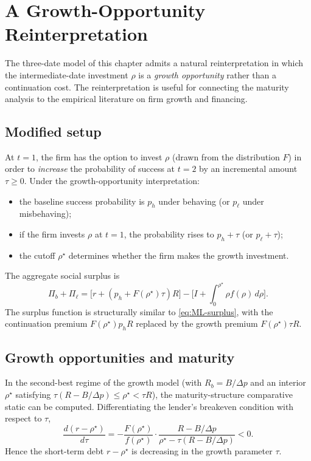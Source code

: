 \documentclass[11pt,a4paper,oneside]{book}
\def\leq{\leqslant}
\def\geq{\geqslant}
\theoremstyle{plain}
\theoremstyle{definition}
\theoremstyle{remark}
\numberwithin{equation}{chapter}
\begin{document}
\section{A Growth-Opportunity Reinterpretation}
\label{sec:ML-growth}

The three-date model of this chapter admits a natural reinterpretation in which the intermediate-date investment $\rho$ is a \emph{growth opportunity} rather than a continuation cost.
The reinterpretation is useful for connecting the maturity analysis to the empirical literature on firm growth and financing.

\subsection{Modified setup}

At $t=1$, the firm has the option to invest $\rho$ (drawn from the distribution $F$) in order to \emph{increase} the probability of success at $t=2$ by an incremental amount $\tau \geq 0$.
Under the growth-opportunity interpretation:
\begin{itemize}
  \item the baseline success probability is $p_h$ under behaving (or $p_\ell$ under misbehaving);
  \item if the firm invests $\rho$ at $t=1$, the probability rises to $p_h + \tau$ (or $p_\ell + \tau$);
  \item the cutoff $\rho^\star$ determines whether the firm makes the growth investment.
\end{itemize}
The aggregate social surplus is
\begin{equation}\label{eq:ML-growth-surplus}
  \Pi_b + \Pi_\ell = \bigl[ r + (p_h + F(\rho^\star) \tau) R \bigr] - \bigl[ I + \int_0^{\rho^\star} \rho f(\rho) \, d\rho \bigr].
\end{equation}
The surplus function is structurally similar to \eqref{eq:ML-surplus}, with the continuation premium $F(\rho^\star) p_h R$ replaced by the growth premium $F(\rho^\star) \tau R$.

\subsection{Growth opportunities and maturity}

In the second-best regime of the growth model (with $R_b = B/\Delta p$ and an interior $\rho^\star$ satisfying $\tau(R - B/\Delta p) \leq \rho^\star < \tau R$), the maturity-structure comparative static can be computed.
Differentiating the lender's breakeven condition with respect to $\tau$,
\begin{equation}\label{eq:ML-growth-maturity}
  \frac{d(r - \rho^\star)}{d \tau} = -\frac{F(\rho^\star)}{f(\rho^\star)} \cdot \frac{R - B/\Delta p}{\rho^\star - \tau(R - B/\Delta p)} < 0.
\end{equation}
Hence the short-term debt $r - \rho^\star$ is decreasing in the growth parameter $\tau$.
\end{document}
